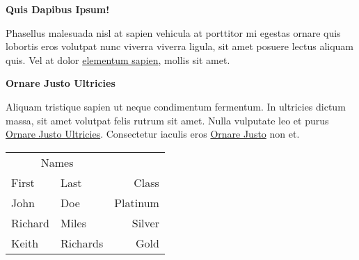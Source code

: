 \documentclass[10pt]{article} %
\begin{document}
\begin{minipage}[t]{.30\linewidth}
\begin{mdframed}[style=sidebar,frametitle={}]

\textbf{Quis Dapibus Ipsum!}

Phasellus malesuada nisl at sapien vehicula at porttitor mi egestas ornare quis lobortis eros volutpat nunc viverra viverra ligula, sit amet posuere lectus aliquam quis. Vel at dolor \href{http://www.example.com}{elementum sapien}, mollis sit amet.

\textbf{Ornare Justo Ultricies}

Aliquam tristique sapien ut neque condimentum fermentum. In ultricies dictum massa, sit amet volutpat felis rutrum sit amet. Nulla vulputate leo et purus \href{http://www.example.com}{Ornare Justo Ultricies}. Consectetur iaculis eros \href{http://www.example.com}{Ornare Justo} non et.


\begin{tabular}{llr}
\toprule
\multicolumn{2}{c}{Names} \\
\cmidrule(r){1-2}
First & Last & Class \\
\midrule
John & Doe & Platinum \\
Richard & Miles & Silver \\
Keith & Richards & Gold \\
\bottomrule
\end{tabular}


\end{mdframed}
\end{minipage}\hfill %
%
%
\end{document}
